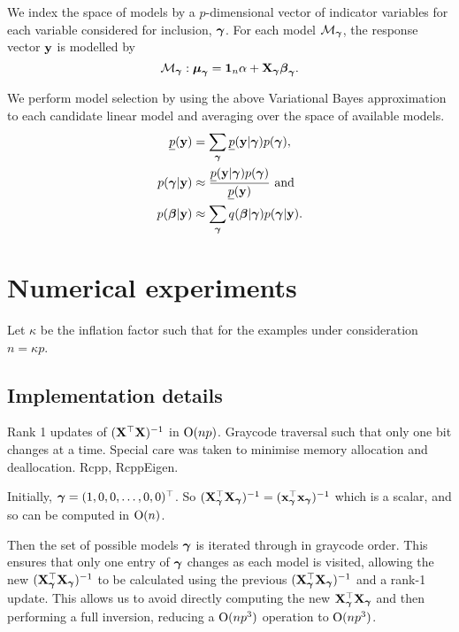 \documentclass{amsart}[12pt]
\begin{document}
We index the space of models by a $p$-dimensional vector of indicator variables for each variable considered 
for inclusion, ${\boldsymbol \gamma}$. For each model $\mathcal{M}_{\boldsymbol \gamma}$, the response vector ${\bf y}$ is modelled by
\begin{equation*}
	\mathcal{M}_{\boldsymbol \gamma}: {\boldsymbol \mu}_{\boldsymbol \gamma} = {\bf 1}_n \alpha + {\bf X}_{\boldsymbol \gamma} {\boldsymbol \beta}_{\boldsymbol \gamma}.
\end{equation*}

We perform model selection by using the above Variational Bayes approximation to each
candidate linear model and averaging over the space of available models.
\begin{align*}
	\underline{p}({\bf y}) & = \sum_{\boldsymbol \gamma} \underline{p}({\bf y}|{\boldsymbol \gamma}) p({\boldsymbol \gamma}),                     \\
	p({\boldsymbol \gamma}|{\bf y})     & \approx \frac{\underline{p}({\bf y}|{\boldsymbol \gamma}) p({\boldsymbol \gamma})}{\underline{p}({\bf y})} \text { and } \\
	p({\boldsymbol \beta}|{\bf y})      & \approx \sum_{\boldsymbol \gamma} q({\boldsymbol \beta}|{\boldsymbol \gamma}) p({\boldsymbol \gamma}|{\bf y}).                    \\
\end{align*}

\section{Numerical experiments}
\label{sec:num_exp}

Let $\kappa$ be the inflation factor such that for the examples under consideration $n = \kappa p$.

\subsection{Implementation details}
\label{sec:implementation}

Rank 1 updates of $({\bf X}^\top {\bf X})^{-1}$ in $\text{O}(np)$.
Graycode traversal such that only one bit changes at a time.
Special care was taken to minimise memory allocation and deallocation.
Rcpp, RcppEigen.

Initially, ${\boldsymbol \gamma} = (1, 0, 0, \ldots, 0, 0)^\top$. So
$({\bf X}_{\boldsymbol \gamma}^\top {\bf X}_{\boldsymbol \gamma})^{-1} = ({\bf x}_{\boldsymbol \gamma}^\top {\bf x}_{\boldsymbol \gamma})^{-1}$ which is a scalar, and so can be
computed in $\text{O}(n)$.

Then the set of possible models ${\boldsymbol \gamma}$ is iterated through in graycode order. This ensures that only one
entry of ${\boldsymbol \gamma}$ changes as each model is visited, allowing the new $({\bf X}_{\boldsymbol \gamma}^\top {\bf X}_{\boldsymbol \gamma})^{-1}$ to
be calculated using the previous $({\bf X}_{\boldsymbol \gamma}^\top {\bf X}_{\boldsymbol \gamma})^{-1}$ and a rank-1 update. This allows us to
avoid directly computing the new ${\bf X}_{\boldsymbol \gamma}^\top {\bf X}_{\boldsymbol \gamma}$ and then performing a full inversion, reducing
a $\text{O}(n p^3)$ operation to $\text{O}(n p^3)$.
\end{document}
